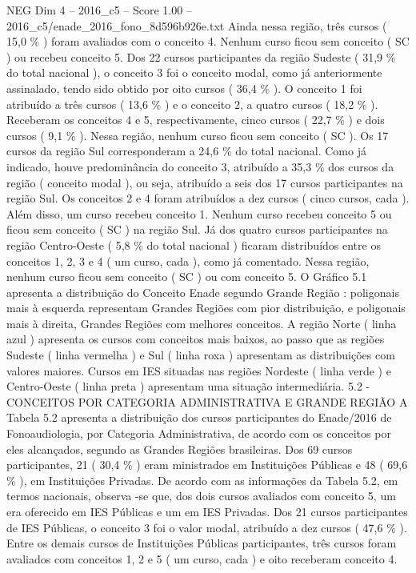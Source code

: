 \begin{textsample}{NEG Dim 4 – 2016\_c5 – Score 1.00 – 2016\_c5/enade\_2016\_fono\_8d596b926e.txt}
Ainda nessa região, três cursos ( 15,0 \% ) foram avaliados com o conceito 4.
Nenhum curso ficou sem conceito ( SC ) ou recebeu conceito 5.
Dos 22 cursos participantes da região Sudeste ( 31,9 \% do total nacional ), o conceito 3 foi o conceito modal, como já anteriormente assinalado, tendo sido obtido por oito cursos ( 36,4 \% ).
O conceito 1 foi atribuído a três cursos ( 13,6 \% ) e o conceito 2, a quatro cursos ( 18,2 \% ).
Receberam os conceitos 4 e 5, respectivamente, cinco cursos ( 22,7 \% ) e dois cursos ( 9,1 \% ).
Nessa região, nenhum curso ficou sem conceito ( SC ).
Os 17 cursos da região Sul corresponderam a 24,6 \% do total nacional.
Como já indicado, houve predominância do conceito 3, atribuído a 35,3 \% dos cursos da região ( conceito modal ), ou seja, atribuído a seis dos 17 cursos participantes na região Sul.
Os conceitos 2 e 4 foram atribuídos a dez cursos ( cinco cursos, cada ).
Além disso, um curso recebeu conceito 1.
Nenhum curso recebeu conceito 5 ou ficou sem conceito ( SC ) na região Sul.
Já dos quatro cursos participantes na região Centro-Oeste ( 5,8 \% do total nacional ) ficaram distribuídos entre os conceitos 1, 2, 3 e 4 ( um curso, cada ), como já comentado.
Nessa região, nenhum curso ficou sem conceito ( SC ) ou com conceito 5.
O Gráfico 5.1 apresenta a distribuição do Conceito Enade segundo Grande Região : poligonais mais à esquerda representam Grandes Regiões com pior distribuição, e poligonais mais à direita, Grandes Regiões com melhores conceitos.
A região Norte ( linha azul ) apresenta os cursos com conceitos mais baixos, ao passo que as regiões Sudeste ( linha vermelha ) e Sul ( linha roxa ) apresentam as distribuições com valores maiores.
Cursos em IES situadas nas regiões Nordeste ( linha verde ) e Centro-Oeste ( linha preta ) apresentam uma situação intermediária. 5.2 - CONCEITOS POR CATEGORIA ADMINISTRATIVA E GRANDE REGIÃO A Tabela 5.2 apresenta a distribuição dos cursos participantes do Enade/2016 de Fonoaudiologia, por Categoria Administrativa, de acordo com os conceitos por eles alcançados, segundo as Grandes Regiões brasileiras.
Dos 69 cursos participantes, 21 ( 30,4 \% ) eram ministrados em Instituições Públicas e 48 ( 69,6 \% ), em Instituições Privadas.
De acordo com as informações da Tabela 5.2, em termos nacionais, observa -se que, dos dois cursos avaliados com conceito 5, um era oferecido em IES Públicas e um em IES Privadas.
Dos 21 cursos participantes de IES Públicas, o conceito 3 foi o valor modal, atribuído a dez cursos ( 47,6 \% ).
Entre os demais cursos de Instituições Públicas participantes, três cursos foram avaliados com conceitos 1, 2 e 5 ( um curso, cada ) e oito receberam conceito 4.

\end{textsample}
